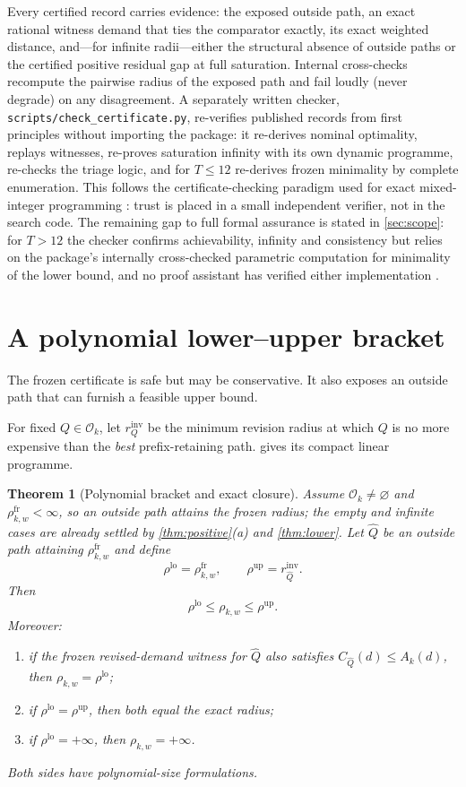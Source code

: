 \documentclass[11pt]{article}
\newtheorem{theorem}{Theorem}[section]
\theoremstyle{definition}
\newcommand{\cO}{\mathcal{O}}
\newcommand{\rhofr}{\rho^{\mathrm{fr}}}
\newcommand{\rholo}{\rho^{\mathrm{lo}}}
\newcommand{\rhohi}{\rho^{\mathrm{up}}}
\begin{document}
Every certified record carries evidence: the exposed outside path, an exact rational witness demand that ties the comparator exactly, its exact weighted distance, and---for infinite radii---either the structural absence of outside paths or the certified positive residual gap at full saturation. Internal cross-checks recompute the pairwise radius of the exposed path and fail loudly (never degrade) on any disagreement. A separately written checker, \texttt{scripts/check\_certificate.py}, re-verifies published records from first principles without importing the package: it re-derives nominal optimality, replays witnesses, re-proves saturation infinity with its own dynamic programme, re-checks the triage logic, and for $T\le12$ re-derives frozen minimality by complete enumeration. This follows the certificate-checking paradigm used for exact mixed-integer programming \parencite{CheungGleixnerSteffy2017,EiflerGleixner2021}: trust is placed in a small independent verifier, not in the search code. The remaining gap to full formal assurance is stated in \cref{sec:scope}: for $T>12$ the checker confirms achievability, infinity and consistency but relies on the package's internally cross-checked parametric computation for minimality of the lower bound, and no proof assistant has verified either implementation \parencite{HuangfuHall2018,VirtanenEtAl2020}.

\section{A polynomial lower--upper bracket}\label{sec:bracket}

The frozen certificate is safe but may be conservative. It also exposes an outside path that can furnish a feasible upper bound.

For fixed $Q\in\cO_k$, let $r_Q^{\mathrm{inv}}$ be the minimum revision radius at which $Q$ is no more expensive than the \emph{best} prefix-retaining path.  gives its compact linear programme.

\begin{theorem}[Polynomial bracket and exact closure]\label{thm:bracket}
Assume $\cO_k\neq\varnothing$ and $\rhofr_{k,w}<\infty$, so an outside path attains the frozen radius; the empty and infinite cases are already settled by \cref{thm:positive}(a) and \cref{thm:lower}. Let $\widehat Q$ be an outside path attaining $\rhofr_{k,w}$ and define
\[
\rholo=\rhofr_{k,w},
\qquad
\rhohi=r_{\widehat Q}^{\mathrm{inv}}.
\]
Then
\begin{equation}\label{eq:bracket}
\rholo\le\rho_{k,w}\le\rhohi.
\end{equation}
Moreover:
\begin{enumerate}[label=(\alph*)]
\item if the frozen revised-demand witness for $\widehat Q$ also satisfies $C_{\widehat Q}(d)\le A_k(d)$, then $\rho_{k,w}=\rholo$;
\item if $\rholo=\rhohi$, then both equal the exact radius;
\item if $\rholo=+\infty$, then $\rho_{k,w}=+\infty$.
\end{enumerate}
Both sides have polynomial-size formulations.
\end{theorem}
\end{document}
